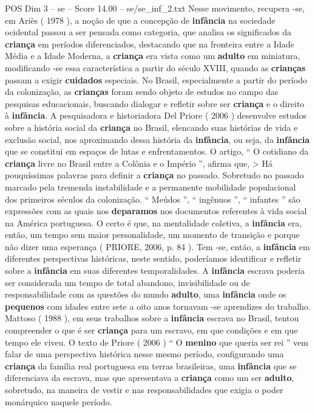 \begin{textsample}{POS Dim 3 – se – Score 14.00 – se/se\_inf\_2.txt}
Nesse movimento, recupera -se, em Ariès ( 1978 ), a noção de que a concepção de \textbf{infância} na sociedade ocidental passou a ser pensada como categoria, que analisa os significados da \textbf{criança} em períodos diferenciados, destacando que na fronteira entre a Idade Média e a Idade Moderna, a \textbf{criança} era vista como um \textbf{adulto} em miniatura, modificando -se essa característica a partir do século XVIII, quando as \textbf{crianças} passam a exigir \textbf{cuidados} especiais.
No Brasil, especialmente a partir do período da colonização, as \textbf{crianças} foram sendo objeto de estudos no campo das pesquisas educacionais, buscando dialogar e refletir sobre ser \textbf{criança} e o direito à \textbf{infância}.
A pesquisadora e historiadora Del Priore ( 2006 ) desenvolve estudos sobre a história social da \textbf{criança} no Brasil, elencando suas histórias de vida e exclusão social, nos aproximando dessa história da \textbf{infância}, ou seja, da \textbf{infância} que se constitui em espaços de lutas e enfrentamentos.
O artigo, “ O cotidiano da \textbf{criança} livre no Brasil entre a Colônia e o Império ”, afirma que, > Há pouquíssimas palavras para definir a \textbf{criança} no passado.
Sobretudo no passado marcado pela tremenda instabilidade e a permanente mobilidade populacional dos primeiros séculos da colonização. “ Meúdos ”, “ ingênuos ”, “ infantes ” são expressões com as quais nos \textbf{deparamos} nos documentos referentes à vida social na América portuguesa.
O certo é que, na mentalidade coletiva, a \textbf{infância} era, então, um tempo sem maior personalidade, um momento de transição e porque não dizer uma esperança ( PRIORE, 2006, p. 84 ).
Tem -se, então, a \textbf{infância} em diferentes perspectivas históricas, neste sentido, poderíamos identificar e refletir sobre a \textbf{infância} em suas diferentes temporalidades.
A \textbf{infância} escrava poderia ser considerada um tempo de total abandono, invisibilidade ou de responsabilidade com as questões do mundo \textbf{adulto}, uma \textbf{infância} onde os \textbf{pequenos} com idades entre sete a oito anos tornavam -se aprendizes do trabalho.
Mattoso ( 1988 ), em seus trabalhos sobre a \textbf{infância} escrava no Brasil, tentou compreender o que é ser \textbf{criança} para um escravo, em que condições e em que tempo ele viveu.
O texto de Priore ( 2006 ) “ O \textbf{menino} que queria ser rei ” vem falar de uma perspectiva histórica nesse mesmo período, configurando uma \textbf{criança} da família real portuguesa em terras brasileiras, uma \textbf{infância} que se diferenciava da escrava, mas que apresentava a \textbf{criança} como um ser \textbf{adulto}, sobretudo, na maneira de vestir e nas responsabilidades que exigia o poder monárquico naquele período.

\end{textsample}
